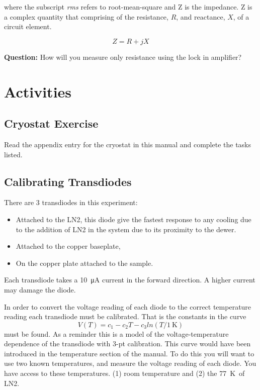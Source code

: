 \documentclass{apl-guide}
\newcommand{\K}{\SI{77}{\kelvin}}
\begin{document}
where the subscript \emph{rms} refers to root-mean-square and Z is the
impedance. Z is a complex quantity that comprising of the resistance, $R$, and
reactance, $X$, of a circuit element.

\begin{equation}
  Z = R + jX 
\end{equation}

\textbf{Question:} How will you measure only resistance using the lock in
amplifier?

\section{Activities}
\subsection{Cryostat Exercise}
Read the appendix entry for the cryostat in this manual and complete the tasks
listed.

\subsection{Calibrating Transdiodes}
There are 3 transdiodes in this experiment:
\begin{itemize}
\item Attached to the LN2, this diode give the fastest response to any cooling
  due to the addition of LN2 in the system due to its proximity to the dewer.
\item Attached to the copper baseplate,
\item On the copper plate attached to the sample. 
\end{itemize}
Each transdiode takes a \SI{10}{\uA} current in the forward direction. A higher
current may damage the diode. 

In order to convert the voltage reading of each diode to the correct temperature
reading each transdiode must be calibrated. That is the constants in the curve
\begin{equation}
V(T) = c_1 - c_2T - c_3 ln(T/\SI{1}{\kelvin})
\end{equation}
must be found. As a reminder this is a model of the voltage-temperature
dependence of the transdiode with 3-pt calibration. This curve would have been
introduced in the temperature section of the manual.
To do this you will want to use two known temperatures, and measure the voltage
reading of each diode. You have access to these temperatures. (1) room
temperature and (2) the \K\ of LN2. 
\end{document}
